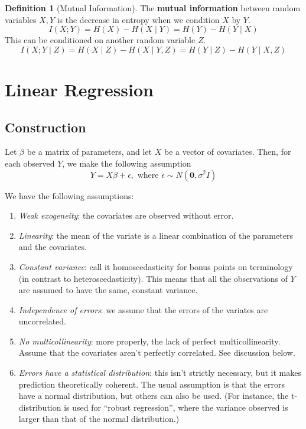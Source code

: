 \documentclass{article}
\theoremstyle{definition}
\theoremstyle{remark}
\theoremstyle{definition}
\newtheorem{definition}{Definition}[section]
\begin{document}
\begin{definition}[Mutual Information]
The \textbf{mutual information} between random variables $X, Y$ is the decrease in entropy when we condition $X$ by $Y$. 
\[I(X ; Y) = H(X) - H(X \mid Y) = H(Y) - H(Y \mid X)\]
This can be conditioned on another random variable $Z$. 
\[I(X ; Y \mid Z) = H(X \mid Z) - H(X \mid Y, Z) = H(Y \mid Z) - H(Y \mid X, Z)\]
\end{definition}



\section{Linear Regression}

\subsection{Construction}

Let $\beta$ be a matrix of parameters, and let $X$ be a vector of covariates. Then, for each observed $Y$, we make the following assumption 
\[Y = X \beta + \epsilon, \text{ where } \epsilon \sim N(\mathbf{0}, \sigma^2 I)\]

We have the following assumptions: 
\begin{enumerate}
  \item \textit{Weak exogeneity}: the covariates are observed without error.
  \item \textit{Linearity}: the mean of the variate is a linear combination of the parameters and the covariates.
  \item \textit{Constant variance}: call it homoscedasticity for bonus points on terminology (in contrast to heteroscedasticity).
  This means that all the observations of $Y$ are assumed to have the same, constant variance.
  \item \textit{Independence of errors}: we assume that the errors of the variates are uncorrelated.
  \item \textit{No multicollinearity}: more properly, the lack of perfect multicollinearity. Assume that the covariates aren't perfectly correlated. See discussion below.
  \item \textit{Errors have a statistical distribution}: this isn't strictly necessary, but it makes prediction theoretically coherent. The usual assumption is that the errors have a normal distribution, but others can also be used.
  (For instance, the t-distribution is used for ``robust regression'', where the variance observed is larger than that of the normal distribution.)
\end{enumerate}
\end{document}

